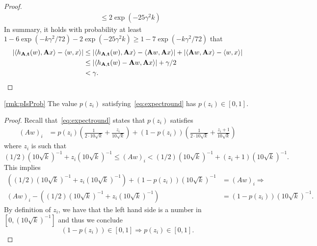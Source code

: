 \begin{proof}
\begin{align*}
&\leq 2 \exp\left( - 25 \gamma^2 k \right)
\end{align*}
In summary, it holds with probability at least $1-6\exp(-k \gamma^2/72) - 2 \exp(-25 \gamma^2 k) \geq 1-7 \exp(-k \gamma^2/72)$ that
\begin{align*}
|\langle h_{\mathbf{A},\mathbf{t}}(w),\mathbf{A} x\rangle - \langle w, x\rangle| &\leq |\langle h_{\mathbf{A},\mathbf{t}}(w),\mathbf{A} x\rangle - \langle \mathbf{A} w, \mathbf{A} x \rangle | + |\langle \mathbf{A} w, \mathbf{A} x \rangle - \langle w, x\rangle|\\
&\leq |\langle h_{\mathbf{A},\mathbf{t}}(w)-\mathbf{A} w,\mathbf{A} x\rangle| + \gamma/2\\
&< \gamma.
\end{align*}
\end{proof}

\begin{customrmk}{\ref{rmk:pIsProb}}
The value $p(z_i)$ satisfying~\eqref{eq:expectround} has $p(z_i) \in [0,1]$.
\end{customrmk}
\begin{proof} 
Recall that~\eqref{eq:expectround} states that $p(z_i)$ satisfies
\begin{align*}
(Aw)_i &= 
p(z_i)\left(\frac{1}{2 \cdot 10 \sqrt{k}} +\frac{z_i}{10\sqrt{k}}\right) + (1-p(z_i))\left(\frac{1}{2 \cdot 10 \sqrt{k}} +\frac{z_i+1}{10\sqrt{k}}\right)
\end{align*}
where $z_i$ is such that
\[
(1/2)(10 \sqrt{k})^{-1}  + z_i (10 \sqrt{k})^{-1} \leq (Aw)_i < (1/2)(10 \sqrt{k})^{-1}  + (z_i+1) (10\sqrt{k})^{-1}.
\]
This implies
\begin{align*}
    ((1/2)(10 \sqrt{k})^{-1} +z_i (10\sqrt{k})^{-1}) + (1-p(z_i))(10\sqrt{k})^{-1} &= (Aw)_i \Rightarrow \\
    (Aw)_i -((1/2)(10 \sqrt{k})^{-1} +z_i (10\sqrt{k})^{-1})&=(1-p(z_i))(10\sqrt{k})^{-1}.
\end{align*}
By definition of $z_i$, we have that the left hand side is a number in $[0,(10\sqrt{k})^{-1}]$ and thus we conclude
\[
(1-p(z_i)) \in [0,1] \Rightarrow p(z_i) \in [0,1].
\]
\end{proof}

